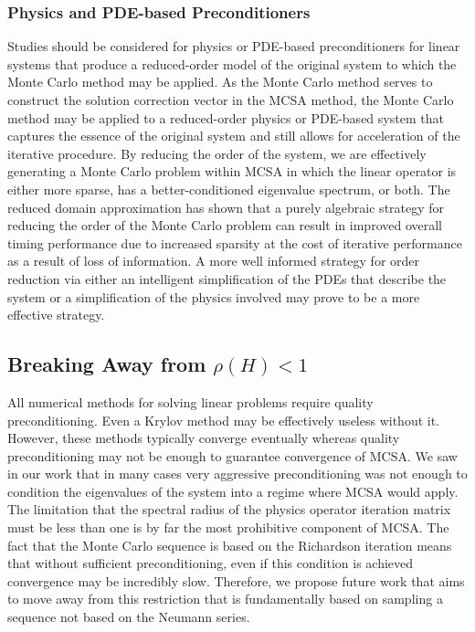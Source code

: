 \subsubsection{Physics and PDE-based Preconditioners}
Studies should be considered for physics or PDE-based preconditioners
for linear systems that produce a reduced-order model of the original
system to which the Monte Carlo method may be applied. As the Monte
Carlo method serves to construct the solution correction vector in the
MCSA method, the Monte Carlo method may be applied to a reduced-order
physics or PDE-based system that captures the essence of the original
system and still allows for acceleration of the iterative
procedure. By reducing the order of the system, we are effectively
generating a Monte Carlo problem within MCSA in which the linear
operator is either more sparse, has a better-conditioned eigenvalue
spectrum, or both. The reduced domain approximation has shown that a
purely algebraic strategy for reducing the order of the Monte Carlo
problem can result in improved overall timing performance due to
increased sparsity at the cost of iterative performance as a result of
loss of information. A more well informed strategy for order reduction
via either an intelligent simplification of the PDEs that describe the
system or a simplification of the physics involved may prove to be a
more effective strategy.

\subsection{Breaking Away from $\rho(H) < 1$}
\label{subsec:future_spec_rad}
All numerical methods for solving linear problems require quality
preconditioning. Even a Krylov method may be effectively useless
without it. However, these methods typically converge eventually
whereas quality preconditioning may not be enough to guarantee
convergence of MCSA. We saw in our work that in many cases very
aggressive preconditioning was not enough to condition the eigenvalues
of the system into a regime where MCSA would apply. The limitation
that the spectral radius of the physics operator iteration matrix must
be less than one is by far the most prohibitive component of MCSA. The
fact that the Monte Carlo sequence is based on the Richardson
iteration means that without sufficient preconditioning, even if this
condition is achieved convergence may be incredibly slow. Therefore,
we propose future work that aims to move away from this restriction
that is fundamentally based on sampling a sequence not based on the
Neumann series.

